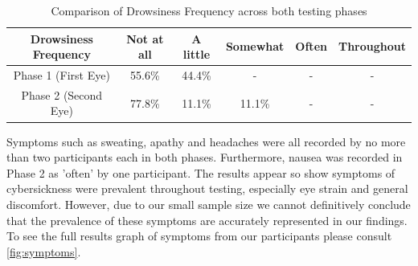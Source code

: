 \documentclass{l4proj}
\begin{document}
\begin{table}[h]
    \centering
    \caption{Comparison of Drowsiness Frequency across both testing phases}
    \label{table:drowsiness}
    \begin{tabular}{|c|c|c|c|c|c|}
        \hline
        \textbf{Drowsiness Frequency} & Not at all & A little & Somewhat & Often & Throughout \\
        \hline
        Phase 1 (First Eye) & 55.6\%  & 44.4\% & - & - & -\\
        \hline
        Phase 2 (Second Eye) & 77.8\% & 11.1\% & 11.1\% & - & -\\
        \hline
    \end{tabular}
\end{table}

Symptoms such as sweating, apathy and  headaches were all recorded by no more than two participants each in both phases. Furthermore, nausea was recorded in Phase 2 as 'often' by one participant. The results appear so show symptoms of cybersickness were prevalent throughout testing, especially eye strain and general discomfort. However, due to our small sample size we cannot definitively conclude that the prevalence of these symptoms are accurately represented in our findings. To see the full results graph of symptoms from our participants please consult \ref{fig:symptoms}.
\end{document}
